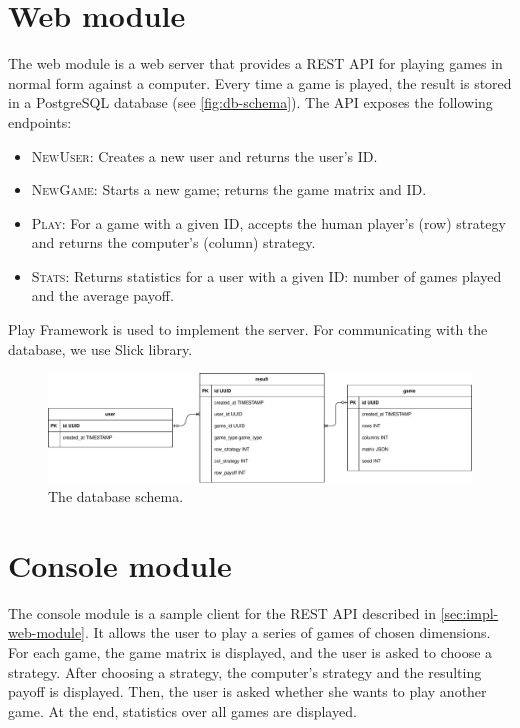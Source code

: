 \section{Web module}
\label{sec:impl-web-module}
The web module is a web server that provides a REST API for playing games in normal form against a computer.
Every time a game is played, the result is stored in a PostgreSQL database (see \autoref{fig:db-schema}).
The API exposes the following endpoints:
\begin{itemize}
	\item \textsc{NewUser}: Creates a new user and returns the user's ID.
	\item \textsc{NewGame}: Starts a new game; returns the game matrix and ID.
	\item \textsc{Play}: For a game with a given ID, accepts the human player's (row) strategy and returns the computer's (column) strategy.
	\item \textsc{Stats}: Returns statistics for a user with a given ID: number of games played and the average payoff.
\end{itemize}

Play Framework is used to implement the server.
For communicating with the database, we use Slick library.

\begin{figure}
	\hspace{-1cm}
	\includegraphics[width=14cm]{fig/schema.pdf}
	\caption{The database schema.}
	\label{fig:db-schema}
\end{figure}

\section{Console module}
The console module is a sample client for the REST API described in \autoref{sec:impl-web-module}.
It allows the user to play a series of games of chosen dimensions.
For each game, the game matrix is displayed, and the user is asked to choose a strategy.
After choosing a strategy, the computer's strategy and the resulting payoff is displayed.
Then, the user is asked whether she wants to play another game.
At the end, statistics over all games are displayed.

